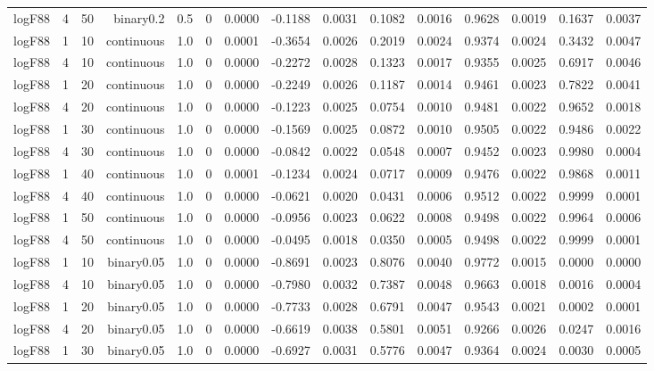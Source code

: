\begin{longtable}{rrrrrrrrrrrrrrr}
  logF88 & 4 & 50 & binary0.2 & 0.5 & 0 & 0.0000 & -0.1188 & 0.0031 & 0.1082 & 0.0016 & 0.9628 & 0.0019 & 0.1637 & 0.0037 \\ 
  logF88 & 1 & 10 & continuous & 1.0 & 0 & 0.0001 & -0.3654 & 0.0026 & 0.2019 & 0.0024 & 0.9374 & 0.0024 & 0.3432 & 0.0047 \\ 
  logF88 & 4 & 10 & continuous & 1.0 & 0 & 0.0000 & -0.2272 & 0.0028 & 0.1323 & 0.0017 & 0.9355 & 0.0025 & 0.6917 & 0.0046 \\ 
  logF88 & 1 & 20 & continuous & 1.0 & 0 & 0.0000 & -0.2249 & 0.0026 & 0.1187 & 0.0014 & 0.9461 & 0.0023 & 0.7822 & 0.0041 \\ 
  logF88 & 4 & 20 & continuous & 1.0 & 0 & 0.0000 & -0.1223 & 0.0025 & 0.0754 & 0.0010 & 0.9481 & 0.0022 & 0.9652 & 0.0018 \\ 
  logF88 & 1 & 30 & continuous & 1.0 & 0 & 0.0000 & -0.1569 & 0.0025 & 0.0872 & 0.0010 & 0.9505 & 0.0022 & 0.9486 & 0.0022 \\ 
  logF88 & 4 & 30 & continuous & 1.0 & 0 & 0.0000 & -0.0842 & 0.0022 & 0.0548 & 0.0007 & 0.9452 & 0.0023 & 0.9980 & 0.0004 \\ 
  logF88 & 1 & 40 & continuous & 1.0 & 0 & 0.0001 & -0.1234 & 0.0024 & 0.0717 & 0.0009 & 0.9476 & 0.0022 & 0.9868 & 0.0011 \\ 
  logF88 & 4 & 40 & continuous & 1.0 & 0 & 0.0000 & -0.0621 & 0.0020 & 0.0431 & 0.0006 & 0.9512 & 0.0022 & 0.9999 & 0.0001 \\ 
  logF88 & 1 & 50 & continuous & 1.0 & 0 & 0.0000 & -0.0956 & 0.0023 & 0.0622 & 0.0008 & 0.9498 & 0.0022 & 0.9964 & 0.0006 \\ 
  logF88 & 4 & 50 & continuous & 1.0 & 0 & 0.0000 & -0.0495 & 0.0018 & 0.0350 & 0.0005 & 0.9498 & 0.0022 & 0.9999 & 0.0001 \\ 
  logF88 & 1 & 10 & binary0.05 & 1.0 & 0 & 0.0000 & -0.8691 & 0.0023 & 0.8076 & 0.0040 & 0.9772 & 0.0015 & 0.0000 & 0.0000 \\ 
  logF88 & 4 & 10 & binary0.05 & 1.0 & 0 & 0.0000 & -0.7980 & 0.0032 & 0.7387 & 0.0048 & 0.9663 & 0.0018 & 0.0016 & 0.0004 \\ 
  logF88 & 1 & 20 & binary0.05 & 1.0 & 0 & 0.0000 & -0.7733 & 0.0028 & 0.6791 & 0.0047 & 0.9543 & 0.0021 & 0.0002 & 0.0001 \\ 
  logF88 & 4 & 20 & binary0.05 & 1.0 & 0 & 0.0000 & -0.6619 & 0.0038 & 0.5801 & 0.0051 & 0.9266 & 0.0026 & 0.0247 & 0.0016 \\ 
  logF88 & 1 & 30 & binary0.05 & 1.0 & 0 & 0.0000 & -0.6927 & 0.0031 & 0.5776 & 0.0047 & 0.9364 & 0.0024 & 0.0030 & 0.0005 \\ 

\end{longtable}

